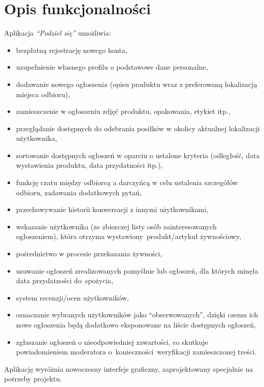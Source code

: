 \documentclass[licencjacka]{pracamgr}
\begin{document}
\section*{Opis funkcjonalności}
Aplikacja \textit{``Podziel się''} umożliwia:
\begin{itemize}
\setlength\itemsep{-0.2em}
\item bezpłatną rejestrację nowego konta,
\item uzupełnienie własnego profilu o podstawowe dane personalne,
\item dodawanie nowego ogłoszenia (opisu produktu wraz z preferowaną lokalizacją miejsca odbioru),
\item zamieszczenie w ogłoszeniu zdjęć produktu, opakowania, etykiet itp.,
\item przeglądanie dostępnych do odebrania posiłków w okolicy aktualnej lokalizacji użytkownika,
\item sortowanie dostępnych ogłoszeń w oparciu o ustalone kryteria (odległość, data wystawienia produktu, data przydatności itp.),
\item funkcję czatu między odbiorcą a darczyńcą w celu ustalenia szczegółów odbioru, zadawania dodatkowych pytań,
\item przechowywanie historii konwersacji z innymi użytkownikami,
\item wskazanie użytkownika (ze zbiorczej listy osób zainteresowanych ogłoszeniem), która otrzyma wystawiony~produkt/artykuł żywnościowy,
\item pośrednictwo w procesie przekazania żywności,
\item usuwanie ogłoszeń zrealizowanych pomyślnie lub ogłoszeń, dla których minęła data przydatności do~spożycia,
\item system recenzji/ocen użytkowników,
\item oznaczanie wybranych użytkowników jako ``obserwowanych'', dzięki czemu ich nowe ogłoszenia będą dodatkowo eksponowane na liście dostępnych ogłoszeń,
\item zgłaszanie ogłoszeń o nieodpowiedniej zawartości, co skutkuje powiadomieniem moderatora o~konieczności~weryfikacji zamieszczonej treści.
\end{itemize}
Aplikację wyróżnia nowoczesny interfejs graficzny, zaprojektowany specjalnie na potrzeby projektu.
\end{document}
